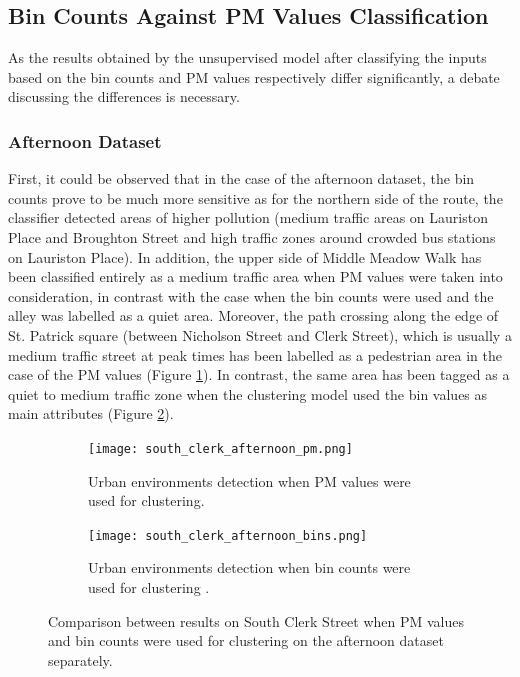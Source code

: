\documentclass[bsc,frontabs,twoside,singlespacing,parskip,deptreport]{infthesis}     %
\begin{document}
\subsection{Bin Counts Against PM Values Classification}
\label{subsec:bin-counts-pm-vals}

As the results obtained by the unsupervised model after classifying the inputs based on the bin counts and PM values respectively differ significantly, a debate discussing the differences is necessary. 

\subsubsection*{Afternoon Dataset}

First, it could be observed that in the case of the afternoon dataset, the bin counts prove to be much more sensitive as for the northern side of the route, the classifier detected areas of higher pollution (medium traffic areas on Lauriston Place and Broughton Street and high traffic zones around crowded bus stations on Lauriston Place).  In addition, the upper side of Middle Meadow Walk has been classified entirely as a medium traffic area when PM values were taken into consideration, in contrast with the case when the bin counts were used and the alley was labelled as a quiet area. Moreover, the path crossing along the edge of St. Patrick square (between Nicholson Street and Clerk Street), which is usually a medium traffic street at peak times has been labelled as a pedestrian area in the case of the PM values (Figure \ref{fig:south-clerk-afternoon-pm}). In contrast, the same area has been tagged as a quiet to medium traffic zone when the clustering model used the bin values as main attributes (Figure \ref{fig:south-clerk-afternoon-bins}).

\begin{figure}[h!]
  \begin{subfigure}[t]{0.5\textwidth}
    \texttt{[image: south\_clerk\_afternoon\_pm.png]}
    \caption{Urban environments detection when PM values were used for clustering.}
    \label{fig:south-clerk-afternoon-pm}
  \end{subfigure}
  \hfill
  \begin{subfigure}[t]{0.5\textwidth}
    \texttt{[image: south\_clerk\_afternoon\_bins.png]}
    \caption{Urban environments detection when bin counts were used for clustering .}
    \label{fig:south-clerk-afternoon-bins}
  \end{subfigure}
  \caption{Comparison between results on South Clerk Street when PM values and bin counts were used for clustering on the afternoon dataset separately.}
  \label{fig:south-clerk-comparison}
\end{figure}
\end{document}
